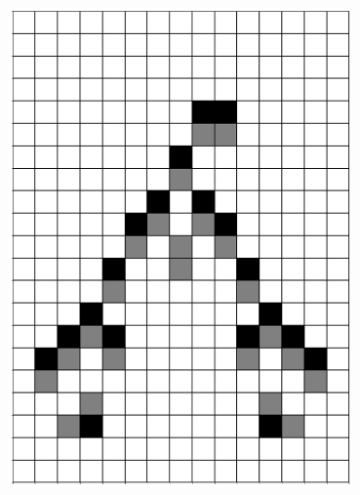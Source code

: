 \documentclass[12pt]{article}
\numberwithin{figure}{section} %
\begin{document}
\begin{figure}[H]
\begin{subfigure}{0.19\textwidth}
     		\includegraphics[width=\linewidth]{Section4/26.1}
     		\subcaption{}
   	\end{subfigure}
        \begin{subfigure}{0.19\textwidth}
     		\centering

\end{subfigure}
\end{figure}
\end{document}
